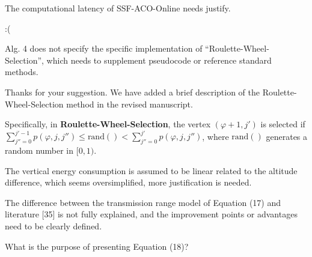 \reviewer

\begin{revcomment} %
	The computational latency of SSF-ACO-Online needs justify.
\end{revcomment}
\begin{revresponse}
	:(
\end{revresponse}

\begin{revcomment}
	Alg. 4 does not specify the specific implementation of ``Roulette-Wheel-Selection'', which needs to supplement pseudocode or reference standard methods.
\end{revcomment}
\begin{revresponse}
	Thanks for your suggestion.
	We have added a brief description of the Roulette-Wheel-Selection method in the revised manuscript.
	\begin{changes}
		Specifically, in \textbf{Roulette-Wheel-Selection}, the vertex $(\varphi+1, j')$ is selected if $\sum_{j''=0}^{j'-1}{p(\varphi,j,j'')}\leq \text{rand}() < \sum_{j''=0}^{j'}{p(\varphi,j,j'')}$, where $\text{rand}()$ generates a random number in $[0,1)$.
	\end{changes}
\end{revresponse}

\begin{revcomment}
	The vertical energy consumption is assumed to be linear related to the altitude difference, which seems oversimplified, more justification is needed.
\end{revcomment}
\begin{revresponse}
	
\end{revresponse}

\begin{revcomment}
	The difference between the transmission range model of Equation (17) and literature [35] is not fully explained, and the improvement points or advantages need to be clearly defined.
\end{revcomment}
\begin{revresponse}
	
\end{revresponse}

\begin{revcomment}
	What is the purpose of presenting Equation (18)?
\end{revcomment}
\begin{revresponse}
	
\end{revresponse}

